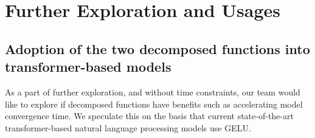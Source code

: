 \documentclass{article}
\begin{document}
\section{Further Exploration and Usages}
\subsection{Adoption of the two decomposed functions into transformer-based models}
As a part of further exploration, and without time constraints, our team would like to explore if decomposed functions have benefits such as accelerating model convergence time. We speculate this on the basis that current state-of-the-art transformer-based natural language processing models use GELU. 
\end{document}
